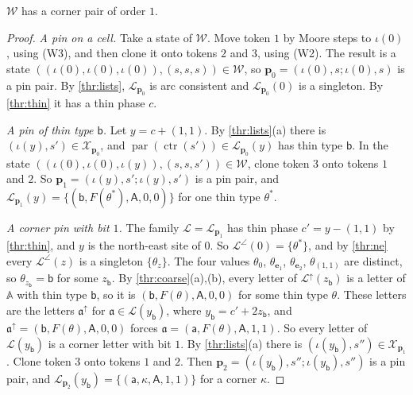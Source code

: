 \begin{lemma}\label{thr:start}
$\mathcal W$ has a corner pair of order $1$.
\end{lemma}

\begin{proof}
\emph{A pin on a cell.} Take a state of $\mathcal W$. Move token $1$ by Moore steps to $\iota(0)$, using (W3), and then clone it onto tokens $2$ and $3$, using (W2). The result is a state $((\iota(0),\iota(0),\iota(0)),(s,s,s))\in\mathcal W$, so $\mathbf p_0=(\iota(0),s;\iota(0),s)$ is a pin pair. By \cref{thr:lists}, $\mathcal L_{\mathbf p_0}$ is arc consistent and $\mathcal L_{\mathbf p_0}(0)$ is a singleton. By \cref{thr:thin} it has a thin phase $c$.

\emph{A pin of thin type $\mathsf b$.} Let $y=c+(1,1)$. By \cref{thr:lists}(a) there is $(\iota(y),s')\in\mathcal X_{\mathbf p_0}$, and $\operatorname{par}(\operatorname{ctr}(s'))\in\mathcal L_{\mathbf p_0}(y)$ has thin type $\mathsf b$. In the state $((\iota(0),\iota(0),\iota(y)),(s,s,s'))\in\mathcal W$, clone token $3$ onto tokens $1$ and $2$. So $\mathbf p_1=(\iota(y),s';\iota(y),s')$ is a pin pair, and $\mathcal L_{\mathbf p_1}(y)=\{(\mathsf b,F(\theta^*),\mathsf A,0,0)\}$ for one thin type $\theta^*$.

\emph{A corner pin with bit $1$.} The family $\mathcal L=\mathcal L_{\mathbf p_1}$ has thin phase $c'=y-(1,1)$ by \cref{thr:thin}, and $y$ is the north-east site of $0$. So $\mathcal L^{\angle}(0)=\{\theta^*\}$, and by \cref{thr:ne} every $\mathcal L^{\angle}(z)$ is a singleton $\{\theta_z\}$. The four values $\theta_0$, $\theta_{\mathbf e_1}$, $\theta_{\mathbf e_2}$, $\theta_{(1,1)}$ are distinct, so $\theta_{z_{\mathsf b}}=\mathsf b$ for some $z_{\mathsf b}$. By \cref{thr:coarse}(a),(b), every letter of $\mathcal L^{\uparrow}(z_{\mathsf b})$ is a letter of $\mathbb A$ with thin type $\mathsf b$, so it is $(\mathsf b,F(\theta),\mathsf A,0,0)$ for some thin type $\theta$. These letters are the letters $\mathfrak a^{\uparrow}$ for $\mathfrak a\in\mathcal L(y_{\mathsf b})$, where $y_{\mathsf b}=c'+2z_{\mathsf b}$, and $\mathfrak a^{\uparrow}=(\mathsf b,F(\theta),\mathsf A,0,0)$ forces $\mathfrak a=(\mathsf a,F(\theta),\mathsf A,1,1)$. So every letter of $\mathcal L(y_{\mathsf b})$ is a corner letter with bit $1$. By \cref{thr:lists}(a) there is $(\iota(y_{\mathsf b}),s'')\in\mathcal X_{\mathbf p_1}$. Clone token $3$ onto tokens $1$ and $2$. Then $\mathbf p_2=(\iota(y_{\mathsf b}),s'';\iota(y_{\mathsf b}),s'')$ is a pin pair, and $\mathcal L_{\mathbf p_2}(y_{\mathsf b})=\{(\mathsf a,\kappa,\mathsf A,1,1)\}$ for a corner $\kappa$.


\end{proof}
